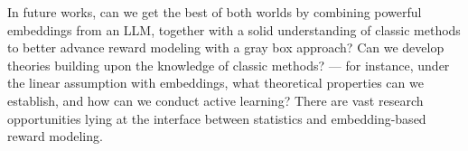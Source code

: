 In future works, can we get the best of both worlds by combining powerful embeddings from an LLM, together with a solid understanding of classic methods to better advance reward modeling with a gray box approach? Can we develop theories building upon the knowledge of classic methods? --- for instance, under the linear assumption with embeddings, what theoretical properties can we establish, and how can we conduct active learning? There are vast research opportunities lying at the interface between statistics and embedding-based reward modeling.

